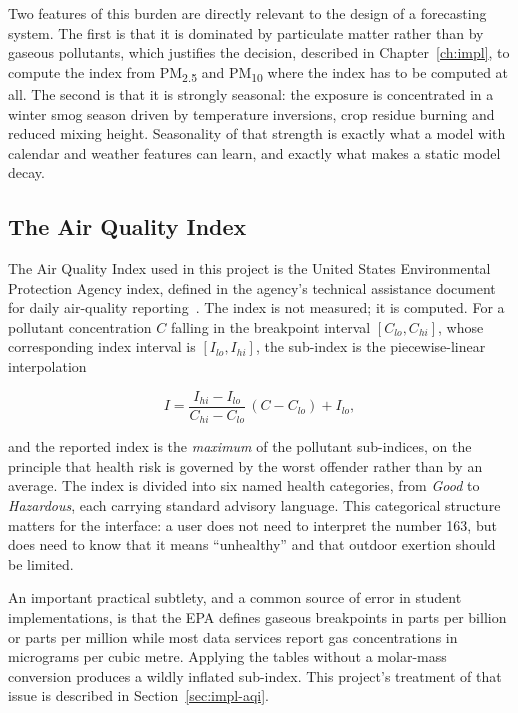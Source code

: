 Two features of this burden are directly relevant to the design of a forecasting
system. The first is that it is dominated by particulate matter rather than by
gaseous pollutants, which justifies the decision, described in
Chapter~\ref{ch:impl}, to compute the index from PM\textsubscript{2.5} and
PM\textsubscript{10} where the index has to be computed at all. The second is
that it is strongly seasonal: the exposure is concentrated in a winter smog
season driven by temperature inversions, crop residue burning and reduced mixing
height. Seasonality of that strength is exactly what a model with calendar and
weather features can learn, and exactly what makes a static model decay.

\subsection{The Air Quality Index}
The Air Quality Index used in this project is the United States Environmental
Protection Agency index, defined in the agency's technical assistance document
for daily air-quality reporting~\cite{ref:epa}. The index is not measured; it is
computed. For a pollutant concentration $C$ falling in the breakpoint interval
$[C_{lo}, C_{hi}]$, whose corresponding index interval is $[I_{lo}, I_{hi}]$, the
sub-index is the piecewise-linear interpolation

\begin{equation}
I = \frac{I_{hi} - I_{lo}}{C_{hi} - C_{lo}}\,(C - C_{lo}) + I_{lo},
\end{equation}

and the reported index is the \emph{maximum} of the pollutant sub-indices, on the
principle that health risk is governed by the worst offender rather than by an
average. The index is divided into six named health categories, from
\emph{Good} to \emph{Hazardous}, each carrying standard advisory language. This
categorical structure matters for the interface: a user does not need to
interpret the number 163, but does need to know that it means ``unhealthy'' and
that outdoor exertion should be limited.

An important practical subtlety, and a common source of error in student
implementations, is that the EPA defines gaseous breakpoints in parts per billion
or parts per million while most data services report gas concentrations in
micrograms per cubic metre. Applying the tables without a molar-mass conversion
produces a wildly inflated sub-index. This project's treatment of that issue is
described in Section~\ref{sec:impl-aqi}.

